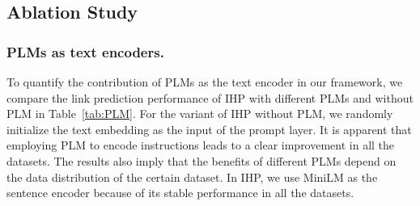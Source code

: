 \subsection{Ablation Study}
\begin{table}[]
\caption{Performance of IHP with different text encoders.}\label{tab:PLM}
\end{table}
\subsubsection{PLMs as text encoders.} 
To quantify the contribution of PLMs as the text encoder in our framework, we compare the link prediction performance of IHP with different PLMs and without PLM in Table~\ref{tab:PLM}. 
For the variant of IHP without PLM, we randomly initialize the text embedding as the input of the prompt layer. 
It is apparent that employing PLM to encode instructions leads to a clear improvement in all the datasets.
The results also imply that the benefits of different PLMs depend on the data distribution of the certain dataset. 
In IHP, we use MiniLM as the sentence encoder because of its stable performance in all the datasets.


